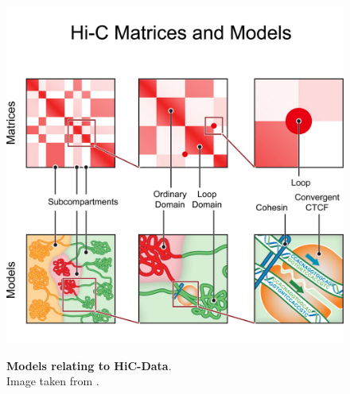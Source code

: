 

\begin{figure}[t]
\begin{centering}
    {\includegraphics[scale=1.5]{figures/background/HiCMatricesModels.jpg}}
    \caption[Models relating to HiC-Data]
    {\textbf{Models relating to HiC-Data}.\\Image taken from \cite{rao20143d}.}

    \label{fig:HiCMatricesModels}
\end{centering}
\end{figure}


